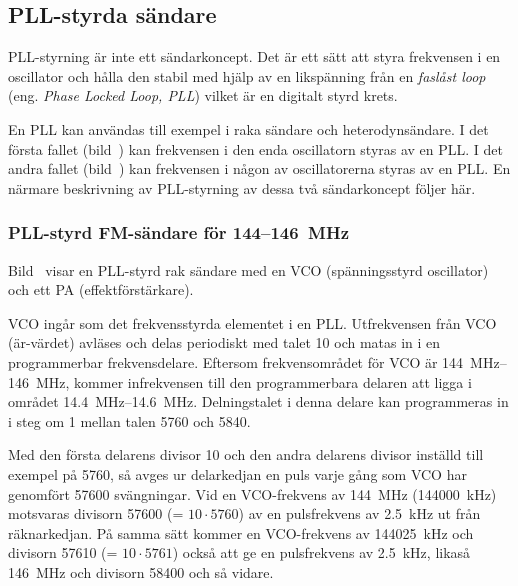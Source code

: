\subsection{PLL-styrda sändare}

PLL-styrning är inte ett sändarkoncept.
Det är ett sätt att styra frekvensen i en oscillator och hålla den stabil med
hjälp av en likspänning från en \emph{faslåst loop} (eng.
\emph{Phase Locked Loop, PLL}) vilket är en digitalt styrd krets.

En PLL kan användas till exempel i raka sändare och heterodynsändare.
I det första fallet (bild~) kan frekvensen i den enda
oscillatorn styras av en PLL.
I det andra fallet (bild~) kan frekvensen i
någon av oscillatorerna styras av en PLL.
En närmare beskrivning av PLL-styrning av dessa två sändarkoncept följer här.

\subsubsection{PLL-styrd FM-sändare för 144--146~MHz}


Bild~ visar en PLL-styrd rak sändare med en VCO
(spänningsstyrd oscillator) och ett PA (effektförstärkare).

VCO ingår som det frekvensstyrda elementet i en PLL.
Utfrekvensen från VCO (är-värdet) avläses och delas periodiskt med talet 10
och matas in i en programmerbar frekvensdelare.
Eftersom frekvensområdet för VCO är \SIrange{144}{146}{\mega\hertz}, kommer
infrekvensen till den programmerbara delaren att ligga i området
\SIrange{14,4}{14,6}{\mega\hertz}.
Delningstalet i denna delare kan programmeras in i steg om 1 mellan
talen 5760 och 5840.

Med den första delarens divisor 10 och den andra delarens divisor
inställd till exempel på 5760, så avges ur delarkedjan en puls varje gång som
VCO har genomfört 57600 svängningar.
Vid en VCO-frekvens av \qty{144}{\mega\hertz} (\qty{144000}{\kilo\hertz}) motsvaras
divisorn 57600 (= \(10 \cdot 5760\)) av en pulsfrekvens av \qty{2,5}{\kilo\hertz}
ut från räknarkedjan.
På samma sätt kommer en VCO-frekvens av \qty{144025}{\kilo\hertz} och divisorn
57610 (= \(10 \cdot 5761\)) också att ge en pulsfrekvens av
\qty{2,5}{\kilo\hertz}, likaså \qty{146}{\mega\hertz} och divisorn 58400 och så
vidare.

